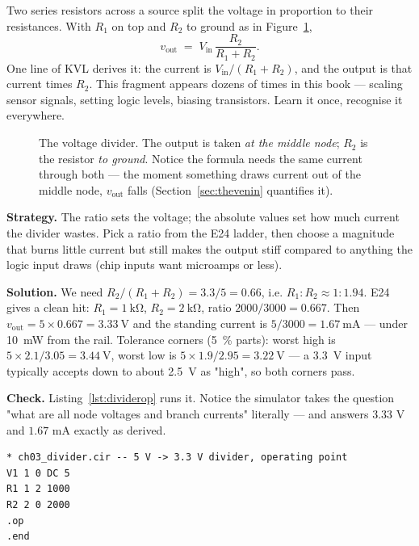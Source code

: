 Two series resistors across a source split the voltage in proportion to their
resistances. With $R_1$ on top and $R_2$ to ground as in
Figure~\ref{fig:divider},
\[
v_{\mathrm{out}} \;=\; V_{\mathrm{in}}\,\frac{R_2}{R_1+R_2}.
\]
One line of KVL derives it: the current is $V_{\mathrm{in}}/(R_1+R_2)$, and
the output is that current times $R_2$. This fragment appears dozens of times
in this book — scaling sensor signals, setting logic levels, biasing
transistors. Learn it once, recognise it everywhere.

\begin{figure}[htbp]
\centering

\caption{The voltage divider. The output is taken \emph{at the middle node};
$R_2$ is the resistor \emph{to ground}. Notice the formula needs the same
current through both — the moment something draws current out of the middle
node, $v_{\mathrm{out}}$ falls (Section~\ref{sec:thevenin} quantifies it).}
\label{fig:divider}
\end{figure}

\begin{example}
\label{ex:div33}
\textbf{Strategy.} The ratio sets the voltage; the absolute values set how
much current the divider wastes. Pick a ratio from the E24 ladder, then
choose a magnitude that burns little current but still makes the output
stiff compared to anything the logic input draws (chip inputs want microamps
or less).

\textbf{Solution.} We need $R_2/(R_1+R_2) = 3.3/5 = 0.66$, i.e.
$R_1 : R_2 \approx 1 : 1.94$. E24 gives a clean hit: $R_1=\qty{1}{\kilo\ohm}$,
$R_2=\qty{2}{\kilo\ohm}$, ratio $2000/3000=0.667$.
Then $v_{\mathrm{out}}=5\times0.667=\qty{3.33}{\volt}$ and the standing
current is $5/3000=\qty{1.67}{\milli\ampere}$ — under \qty{10}{\milli\watt}
from the rail. Tolerance corners (\qty{5}{\percent} parts): worst high is
$5\times2.1/3.05=\qty{3.44}{\volt}$, worst low is
$5\times1.9/2.95=\qty{3.22}{\volt}$ — a \qty{3.3}{\volt} input typically
accepts down to about \qty{2.5}{\volt} as "high", so both corners pass.

\textbf{Check.} Listing~\ref{lst:dividerop} runs it. Notice the simulator
takes the question "what are all node voltages and branch currents" literally
— and answers 3.33 V and $1.67$ mA exactly as derived.
\end{example}

\begin{lstlisting}[language={},caption={\texttt{code/ch03\_divider.cir} — the divider as a netlist.},label=lst:dividercir]
* ch03_divider.cir -- 5 V -> 3.3 V divider, operating point
V1 1 0 DC 5
R1 1 2 1000
R2 2 0 2000
.op
.end
\end{lstlisting}


